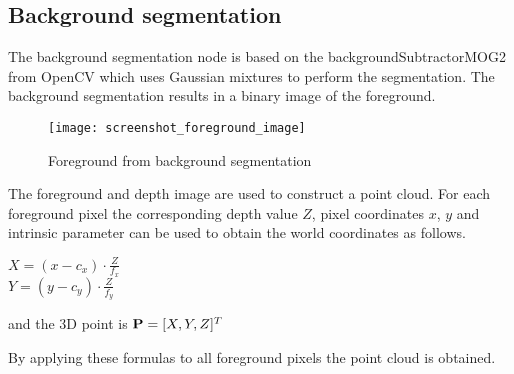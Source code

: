 
\subsection{Background segmentation}


The background segmentation node is based on the backgroundSubtractorMOG2 from OpenCV \cite{BGS} which uses Gaussian mixtures to perform the segmentation. The background segmentation results in a binary image of the foreground. 

\begin{figure}[H]
\begin{center}
\texttt{[image: screenshot\_foreground\_image]}
\caption{Foreground from background segmentation}

\end{center}
\end{figure}


The foreground and depth image are used to construct a point cloud. For each foreground pixel the corresponding depth value $Z$, pixel coordinates $x$, $y$ and intrinsic parameter can be used to obtain the world coordinates as follows.

\begin{center}
$\displaystyle X = (x - c_x) \cdot \frac{Z}{f_x}$\\ \vspace{10 pt}
$\displaystyle Y = (y - c_y) \cdot \frac{Z}{f_y}$

and the 3D point is ${\bf P} = [X, Y, Z]^T$
\end{center}


By applying these formulas to all foreground pixels the point cloud is obtained.


